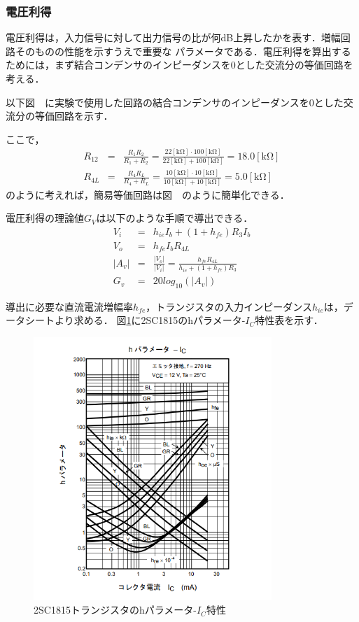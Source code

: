\documentclass[dvipdfmx,titlepage,a4j]{jsarticle}  %
\numberwithin{equation}{section}
\begin{document}
\subsubsection{電圧利得}
電圧利得は，入力信号に対して出力信号の比が何dB上昇したかを表す．増幅回路そのものの性能を示すうえで重要な
パラメータである．電圧利得を算出するためには，まず結合コンデンサのインピーダンスを0とした交流分の等価回路を考える．

以下図　に実験で使用した回路の結合コンデンサのインピーダンスを0とした交流分の等価回路を示す．

ここで，
\begin{eqnarray}
  R_{12} &=& \frac{R_1 R_2}{R_1 + R_2} = \frac{22\mathrm{[k\Omega]} \cdot 100\mathrm{[k\Omega]}}{22\mathrm{[k\Omega]} + 100\mathrm{[k\Omega]}} = 18.0\mathrm{[k\Omega]} \\
  R_{4L} &=& \frac{R_4 R_L}{R_4 + R_L}= \frac{10\mathrm{[k\Omega]} \cdot 10\mathrm{[k\Omega]}}{10\mathrm{[k\Omega]} + 10\mathrm{[k\Omega]}} = 5.0\mathrm{[k\Omega]}
\end{eqnarray}
のように考えれば，簡易等価回路は図　のように簡単化できる．

電圧利得の理論値$G_V$は以下のような手順で導出できる．
\begin{eqnarray}
  V_i &=& h_{ie} I_b + (1+h_{fe})R_3 I_b \\
  V_o &=& h_{fe} I_b R_{4L} \\
  \left\lvert A_v \right\rvert &=& \frac{\left\lvert V_o \right\rvert}{\left\lvert V_i \right\rvert}
  = \frac{h_{fe} R_{4L}}{h_{ie} + (1+h_{fe})R_3} \\
  G_v &=& 20log_{10}(\left\lvert A_v \right\rvert)
\end{eqnarray}

導出に必要な直流電流増幅率$h_{fe}$，トランジスタの入力インピーダンス$h_{ie}$は，データシートより求める．
図\ref{fig:hic.png}に2SC1815のhパラメータ-$I_C$特性表を示す．

\begin{figure}[H]
  \centering
  \includegraphics[width=9cm]{../2sc1815/hic.png}
  \caption{2SC1815トランジスタのhパラメータ-$I_C$特性}
  \label{fig:hic.png}
\end{figure}
\end{document}
